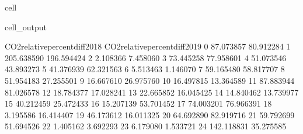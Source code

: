 \documentclass[letterpaper,10pt,english]{jupyterBook}
\begin{document}
\begin{sphinxuseclass}{cell}
\begin{sphinxVerbatimOutput}
\begin{sphinxuseclass}{cell_output}
\begin{sphinxVerbatim}[commandchars=\\\{\}]
    CO2\PYGZus{}relative\PYGZus{}percent\PYGZus{}diff\PYGZus{}2018  CO2\PYGZus{}relative\PYGZus{}percent\PYGZus{}diff\PYGZus{}2019  \PYGZbs{}
0                       \PYGZhy{}87.073857                      \PYGZhy{}80.912284   
1                      \PYGZhy{}205.638590                     \PYGZhy{}196.594424   
2                        \PYGZhy{}2.108366                       \PYGZhy{}7.458060   
3                        73.445258                       77.958601   
4                        51.073546                       43.893273   
5                       \PYGZhy{}41.376939                      \PYGZhy{}62.321563   
6                         5.513463                        1.146070   
7                        59.165480                       58.817707   
8                        51.954183                       27.255501   
9                       \PYGZhy{}16.667610                      \PYGZhy{}26.975760   
10                       16.497815                       13.364589   
11                       87.883944                       81.026578   
12                       18.784377                       17.028241   
13                      \PYGZhy{}22.665852                      \PYGZhy{}16.045425   
14                       14.840462                       13.739977   
15                       40.212459                       25.472433   
16                      \PYGZhy{}15.207139                      \PYGZhy{}53.701452   
17                       74.003201                       76.966391   
18                       \PYGZhy{}3.195586                      \PYGZhy{}16.414407   
19                       46.173612                       16.011325   
20                      \PYGZhy{}64.692890                      \PYGZhy{}82.919716   
21                       59.792699                       51.694526   
22                        1.405162                        3.692293   
23                        6.179080                       \PYGZhy{}1.533721   
24                      142.118831                      \PYGZhy{}35.275585   


\end{sphinxVerbatim}
\end{sphinxuseclass}
\end{sphinxVerbatimOutput}
\end{sphinxuseclass}
\end{document}
